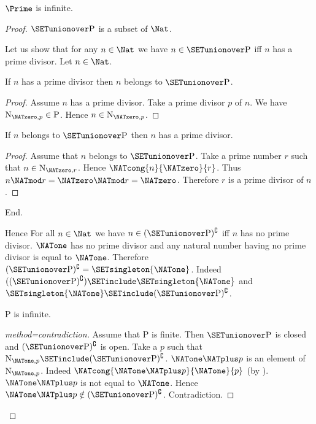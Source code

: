 \documentclass{article}
\newcommand{\N}{\mathrm{N}}
\newcommand{\Ps}{\mathrm{P}}
\begin{document}
\begin{forthel}
    \begin{theorem}[title=Furstenberg]
      $\Prime$ is infinite.
    \end{theorem}
    \begin{proof}
      $\SETunionover \Ps$ is a subset of $\Nat$.

      Let us show that for any $n \in \Nat$ we have $n \in \SETunionover \Ps$ iff $n$
      has a prime divisor.
        Let $n \in \Nat$.

        If $n$ has a prime divisor then $n$ belongs to $\SETunionover \Ps$.
        \begin{proof}
          Assume $n$ has a prime divisor.
          Take a prime divisor $p$ of $n$.
          We have $\N_{\NATzero, p} \in \Ps$.
          Hence $n \in \N_{\NATzero, p}$.
        \end{proof}

        If $n$ belongs to $\SETunionover \Ps$ then $n$ has a prime divisor.
        \begin{proof}
          Assume that $n$ belongs to $\SETunionover \Ps$.
          Take a prime number $r$ such that $n \in \N_{\NATzero, r}$.
          Hence $\NATcong{n}{\NATzero}{r}$.
          Thus $n \NATmod r = \NATzero \NATmod r = \NATzero$.
          Therefore $r$ is a prime divisor of $n$.
        \end{proof}
      End.

      Hence For all $n \in \Nat$ we have $n \in (\SETunionover \Ps)^\complement$ iff
      $n$ has no prime divisor.
      $\NATone$ has no prime divisor and any natural number having no prime
      divisor is equal to $\NATone$.
      Therefore $(\SETunionover \Ps)^\complement = \SETsingleton{\NATone}$.
      Indeed $((\SETunionover \Ps)^\complement) \SETinclude \SETsingleton{\NATone}$ and $\SETsingleton{\NATone}
      \SETinclude (\SETunionover \Ps)^\complement$. %

      $\Ps$ is infinite.
      \begin{proof}[method=contradiction]
        Assume that $\Ps$ is finite.
        Then $\SETunionover \Ps$ is closed and $(\SETunionover \Ps)^\complement$ is open.
        Take a $p$ such that $\N_{\NATone, p} \SETinclude (\SETunionover \Ps)^\complement$.
        $\NATone \NATplus p$ is an element of $\N_{\NATone, p}$.
        Indeed $\NATcong{\NATone \NATplus p}{\NATone}{p}$
        (by ).
        $\NATone \NATplus p$ is not equal to $\NATone$.
        Hence $\NATone \NATplus p \notin (\SETunionover \Ps)^\complement$.
        Contradiction.
      \end{proof}
    \end{proof}
  \end{forthel}

  \printbibliography
\end{document}
